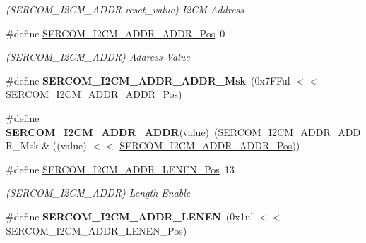 \begin{DoxyCompactItemize}
\begin{DoxyCompactList}\small\item\em (S\+E\+R\+C\+O\+M\+\_\+\+I2\+C\+M\+\_\+\+A\+D\+D\+R reset\+\_\+value) I2\+C\+M Address \end{DoxyCompactList}\item 
\hypertarget{group___s_a_m_l21___s_e_r_c_o_m_ga80a69237a461051597db4746c45dd5a4}{}\#define \hyperlink{group___s_a_m_l21___s_e_r_c_o_m_ga80a69237a461051597db4746c45dd5a4}{S\+E\+R\+C\+O\+M\+\_\+\+I2\+C\+M\+\_\+\+A\+D\+D\+R\+\_\+\+A\+D\+D\+R\+\_\+\+Pos}~0\label{group___s_a_m_l21___s_e_r_c_o_m_ga80a69237a461051597db4746c45dd5a4}

\begin{DoxyCompactList}\small\item\em (S\+E\+R\+C\+O\+M\+\_\+\+I2\+C\+M\+\_\+\+A\+D\+D\+R) Address Value \end{DoxyCompactList}\item 
\hypertarget{group___s_a_m_l21___s_e_r_c_o_m_ga2d6fa8e1a0522f1375e8964949d80636}{}\#define {\bfseries S\+E\+R\+C\+O\+M\+\_\+\+I2\+C\+M\+\_\+\+A\+D\+D\+R\+\_\+\+A\+D\+D\+R\+\_\+\+Msk}~(0x7\+F\+Ful $<$$<$ S\+E\+R\+C\+O\+M\+\_\+\+I2\+C\+M\+\_\+\+A\+D\+D\+R\+\_\+\+A\+D\+D\+R\+\_\+\+Pos)\label{group___s_a_m_l21___s_e_r_c_o_m_ga2d6fa8e1a0522f1375e8964949d80636}

\item 
\hypertarget{group___s_a_m_l21___s_e_r_c_o_m_ga536c650ed878fb932e33d7d8c9c3775d}{}\#define {\bfseries S\+E\+R\+C\+O\+M\+\_\+\+I2\+C\+M\+\_\+\+A\+D\+D\+R\+\_\+\+A\+D\+D\+R}(value)~(S\+E\+R\+C\+O\+M\+\_\+\+I2\+C\+M\+\_\+\+A\+D\+D\+R\+\_\+\+A\+D\+D\+R\+\_\+\+Msk \& ((value) $<$$<$ \hyperlink{group___s_a_m_l21___s_e_r_c_o_m_ga80a69237a461051597db4746c45dd5a4}{S\+E\+R\+C\+O\+M\+\_\+\+I2\+C\+M\+\_\+\+A\+D\+D\+R\+\_\+\+A\+D\+D\+R\+\_\+\+Pos}))\label{group___s_a_m_l21___s_e_r_c_o_m_ga536c650ed878fb932e33d7d8c9c3775d}

\item 
\hypertarget{group___s_a_m_l21___s_e_r_c_o_m_ga09b7c3b6a320a52bf17d8ad445924aac}{}\#define \hyperlink{group___s_a_m_l21___s_e_r_c_o_m_ga09b7c3b6a320a52bf17d8ad445924aac}{S\+E\+R\+C\+O\+M\+\_\+\+I2\+C\+M\+\_\+\+A\+D\+D\+R\+\_\+\+L\+E\+N\+E\+N\+\_\+\+Pos}~13\label{group___s_a_m_l21___s_e_r_c_o_m_ga09b7c3b6a320a52bf17d8ad445924aac}

\begin{DoxyCompactList}\small\item\em (S\+E\+R\+C\+O\+M\+\_\+\+I2\+C\+M\+\_\+\+A\+D\+D\+R) Length Enable \end{DoxyCompactList}\item 
\hypertarget{group___s_a_m_l21___s_e_r_c_o_m_ga3f2c60ee13d7755806c78ebc56118c2b}{}\#define {\bfseries S\+E\+R\+C\+O\+M\+\_\+\+I2\+C\+M\+\_\+\+A\+D\+D\+R\+\_\+\+L\+E\+N\+E\+N}~(0x1ul $<$$<$ S\+E\+R\+C\+O\+M\+\_\+\+I2\+C\+M\+\_\+\+A\+D\+D\+R\+\_\+\+L\+E\+N\+E\+N\+\_\+\+Pos)\label{group___s_a_m_l21___s_e_r_c_o_m_ga3f2c60ee13d7755806c78ebc56118c2b}


\end{DoxyCompactItemize}
